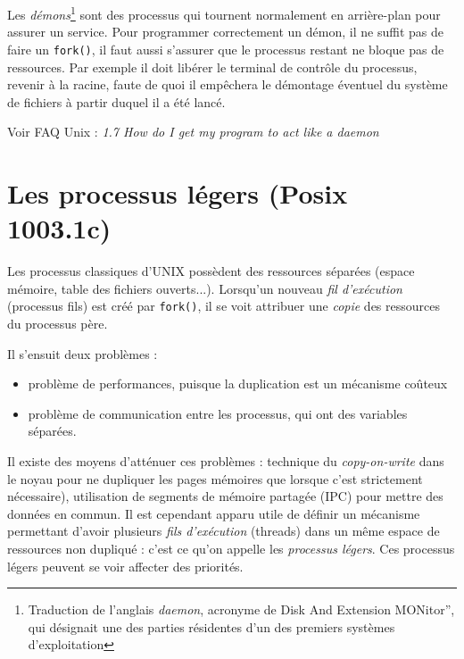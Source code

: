 Les \emph{démons}\footnote{Traduction de l'anglais \emph{daemon}, 
acronyme de  Disk And Extension MONitor'', qui désignait une
des parties résidentes d'un des premiers systèmes d'exploitation}
 sont des processus qui tournent normalement en
arrière-plan pour assurer un service. Pour programmer correctement un
démon, il ne suffit pas de faire un \texttt{fork()}, il faut aussi
s'assurer que le processus restant ne bloque pas de ressources. Par
exemple il doit libérer le terminal de contrôle du processus, revenir
à la racine, faute de quoi il empêchera le démontage éventuel du système de
fichiers à partir duquel il a été lancé.



\source



Voir FAQ Unix : \emph{1.7 How do I get my program to act like a daemon}


\section{Les processus légers (Posix 1003.1c)}


Les processus classiques d'UNIX possèdent des ressources
séparées (espace mémoire, table des fichiers ouverts...).
Lorsqu'un nouveau \emph{fil d'exécution} (processus fils) 
est créé par \texttt{fork()}, il se voit attribuer une 
\emph{copie} des ressources du
processus père. 


Il s'ensuit deux problèmes : 
\begin{itemize}
\item  problème de  performances, puisque la 
duplication est un mécanisme coûteux
\item  problème de communication entre les processus, qui ont 
des variables séparées.
\end{itemize}

Il existe des moyens d'atténuer ces problèmes : technique du 
\emph{copy-on-write} dans le noyau pour ne dupliquer les
pages mémoires que lorsque
      c'est strictement nécessaire), utilisation
de segments de mémoire partagée (IPC) pour mettre des données en commun.
Il est cependant apparu utile de définir un mécanisme permettant
d'avoir plusieurs \emph{fils d'exécution} (threads) dans un même espace de
ressources non dupliqué : c'est ce qu'on appelle les 
\emph{processus légers}. Ces processus légers peuvent se voir affecter 
des priorités.


